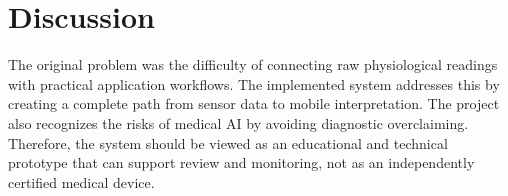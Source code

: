 \section{Discussion}

The original problem was the difficulty of connecting raw physiological readings with practical application workflows. The implemented system addresses this by creating a complete path from sensor data to mobile interpretation. The project also recognizes the risks of medical AI by avoiding diagnostic overclaiming. Therefore, the system should be viewed as an educational and technical prototype that can support review and monitoring, not as an independently certified medical device.
